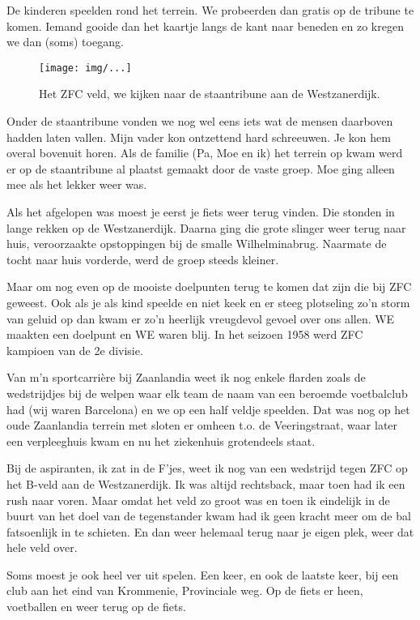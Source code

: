 \documentclass[10pt,twoside,openright]{memoir}
\begin{document}
De kinderen speelden rond het terrein. We probeerden dan gratis op de tribune te komen. Iemand gooide dan het kaartje langs de kant naar beneden en zo kregen we dan (soms) toegang. 

\begin{figure}[t]
\texttt{[image: img/...]}
\caption{Het ZFC veld, we kijken naar de staantribune aan de Westzanerdijk.}
\end{figure}

Onder de staantribune vonden we nog wel eens iets wat de mensen daarboven hadden laten vallen. Mijn vader kon ontzettend hard schreeuwen. Je kon hem overal bovenuit horen. Als de familie (Pa, Moe en ik) het terrein op kwam werd er op de staantribune al plaatst gemaakt door de vaste groep. Moe ging alleen mee als het lekker weer was. 

Als het afgelopen was moest je eerst je fiets weer terug vinden. Die stonden in lange rekken op de Westzanerdijk. Daarna ging die grote slinger weer terug naar huis, veroorzaakte opstoppingen bij de smalle Wilhelminabrug. Naarmate de tocht naar huis vorderde, werd de groep steeds kleiner. 

Maar om nog even op de mooiste doelpunten terug te komen dat zijn die bij ZFC geweest. Ook als je als kind speelde en niet keek en er steeg plotseling zo’n storm van geluid op dan kwam er zo’n heerlijk vreugdevol gevoel over ons allen. WE maakten een doelpunt en WE waren blij. In het seizoen 1958 werd ZFC kampioen van de 2e divisie.

Van m’n sportcarrière bij Zaanlandia weet ik nog enkele flarden zoals de wedstrijdjes bij de welpen waar elk team de naam van een beroemde voetbalclub had (wij waren Barcelona) en we op een half veldje speelden. Dat was nog op het oude Zaanlandia terrein met sloten er omheen t.o. de Veeringstraat, waar later een verpleeghuis kwam en nu het ziekenhuis grotendeels staat.

Bij de aspiranten, ik zat in de F’jes, weet ik nog van een wedstrijd tegen ZFC op het B-veld aan de Westzanerdijk. Ik was altijd rechtsback, maar toen had ik een rush naar voren. Maar omdat het veld zo groot was en toen ik eindelijk in de buurt van het doel van de tegenstander kwam had ik geen kracht meer om de bal fatsoenlijk in te schieten. En dan weer helemaal terug naar je eigen plek, weer dat hele veld over. 

Soms moest je ook heel ver uit spelen. Een keer, en ook de laatste keer, bij een club aan het eind van Krommenie, Provinciale weg. Op de fiets er heen, voetballen en weer terug op de fiets. 
\end{document}
